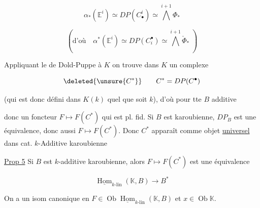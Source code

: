 
\[
 \alpha_{*}(\mathbb E^i)\simeq DP(C_{\bullet}^{i})\simeq\overset{i+1}{\bigwedge}\Phi_{*}
\]

\[
 (\text{d'où}\quad\alpha^{*}(\mathbb E^i)\simeq DP(C_{i}^{\bullet})\simeq\overset{i+1}{\bigwedge}\check{\Phi}_{*}\;)
\]



Appliquant le  de Dold-Puppe à $K$  on trouve dans $K$ un complexe

\[
 \deleted{\unsure{C^{*}}}\qquad C^{*}=DP(C^{\bullet})
\]

 (qui est donc défini dans  $K(k)$ quel que soit $k$), d'où pour tte $B$ additive


donc un foncteur $F\mapsto F(C^{*})$ qui est pl. fid. Si $B$ est karoubienne, $DP_B$ est une équivalence, donc aussi $F\mapsto F(C^{*})$. Donc $C^{*}$ apparaît comme objet  \uline{universel} dans cat. $k$-Additive karoubienne

\uline{Prop 5} Si $B$ est $k$-additive karoubienne, alors $F\mapsto F(C^{*})$ est une équivalence

\[
 \underline{\operatorname{Hom}}_{k\text{-}\mathrm{lin}}(\mathbb K,B)\longrightarrow B^{*}
\]

On a un isom canonique  en $F\in\operatorname{Ob}\underline{\operatorname{Hom}}_{k\text{-}\mathrm{lin}}(\mathbb K,B)$ et $x\in\operatorname{Ob}\mathbb K$.

\margin{\unsure{$\wr$}}

